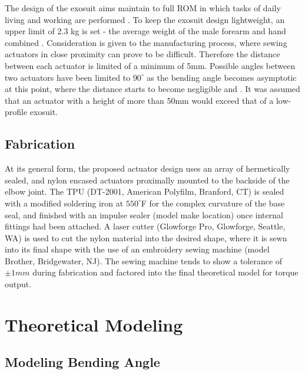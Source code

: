 \documentclass[letterpaper, 10 pt, conference]{ieeeconf}  %
\begin{document}
 
 

 
 
 The design of the exosuit aims maintain to full ROM in which tasks of daily living and working are performed \cite{sardelli2011functional}.   To keep the exosuit design lightweight, an upper limit of 2.3 kg is set - the average weight of the male forearm and hand combined \cite{clauser1969weight}.    Consideration is given to the manufacturing process, where sewing actuators in close proximity can prove to be difficult. Therefore the distance between each actuator is limited of a minimum of 5mm. Possible angles between two actuators have been limited to $90^{\circ}$ as the bending angle becomes asymptotic at this point, where the distance starts to become negligible and . It was assumed that an actuator with a height of more than 50mm would exceed that of a low-profile exosuit.  
 

 
 

 \subsection{Fabrication}
 At its general form, the proposed actuator design uses an array of hermetically sealed, and nylon encased actuators proximally mounted to the backside of the elbow joint.   The TPU  (DT-2001, American Polyfilm, Branford, CT) is sealed with a modified soldering iron at $550^{\circ}$F for the complex curvature of the base seal, and finished with an impulse sealer (model make location) once internal fittings had been attached.  A laser cutter (Glowforge Pro, Glowforge, Seattle, WA) is used to cut the nylon material into the desired shape, where it is sewn into its final shape with the use of an embroidery sewing machine (model Brother, Bridgewater, NJ).  The sewing machine tends to show a tolerance of $\pm1mm$ during fabrication and factored into the final theoretical model for torque output. 

\section{Theoretical Modeling}

\subsection{Modeling Bending Angle}
\end{document}
